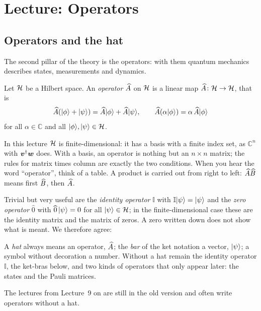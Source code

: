 
\section{Lecture: Operators}

\subsection{Operators and the hat}
The second pillar of the theory is the operators: with them quantum mechanics describes states, measurements and dynamics.
\begin{definition}
	Let $\mathcal{H}$ be a Hilbert space. An \emph{operator} $\widehat{A}$ on $\mathcal{H}$ is a linear map $\widehat{A}\colon\mathcal{H} \to \mathcal{H}$, that is
\begin{equation}
	\widehat{A}(\lvert \phi \rangle + \lvert \psi \rangle) = \widehat{A}\lvert \phi \rangle + \widehat{A}\lvert \psi \rangle, \qquad
	\widehat{A}(\alpha\lvert \phi \rangle) = \alpha\,\widehat{A}\lvert \phi \rangle
\end{equation}
for all $\alpha\in\mathbb{C}$ and all $\lvert \phi \rangle,\lvert \psi \rangle\in\mathcal{H}$.
\end{definition}

In this lecture $\mathcal{H}$ is finite-dimensional: it has a basis with a finite index set, as $\mathbb{C}^n$ with $\boldsymbol{v}^{\dagger}\boldsymbol{w}$ does. With a basis, an operator is nothing but an $n\times n$ matrix; the rules for matrix times column are exactly the two conditions. When you hear the word ``operator'', think of a table. A product is carried out from right to left: $\widehat{A}\widehat{B}$ means first $\widehat{B}$, then $\widehat{A}$.

Trivial but very useful are the \emph{identity operator} $\mathbb{I}$ with $\mathbb{I}\lvert \psi \rangle = \lvert \psi \rangle$ and the \emph{zero operator} $\widehat{0}$ with $\widehat{0}\,\lvert \psi \rangle = 0$ for all $\lvert \psi \rangle\in\mathcal{H}$; in the finite-dimensional case these are the identity matrix and the matrix of zeros. A zero written down does not show what is meant. We therefore agree:

\begin{merksatz}[Notation]
	A \emph{hat} always means an operator, $\widehat{A}$; the \emph{bar} of the ket notation a vector, $\lvert \psi \rangle$; a symbol without decoration a number. Without a hat remain the identity operator $\mathbb{I}$, the ket-bras below, and two kinds of operators that only appear later: the states and the Pauli matrices.
\end{merksatz}
The lectures from Lecture~9 on are still in the old version and often write operators without a hat.

